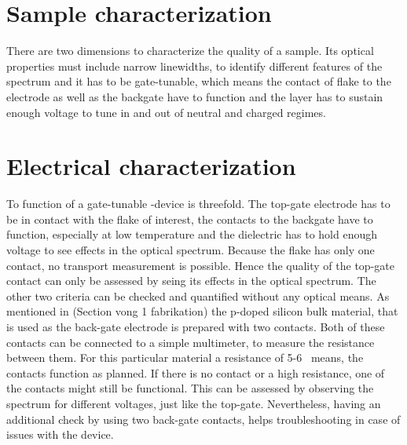 \section{Sample characterization}

There are two dimensions to characterize the quality of a sample. Its optical properties must include narrow linewidths, to identify different features of the spectrum and it has to be gate-tunable, which means the contact of \tmdg flake to the electrode as well as the backgate have to function and the \sio layer has to sustain enough voltage to tune in and out of neutral and charged regimes.

\section{Electrical characterization}

To function of a gate-tunable \tmd-device is threefold. The top-gate electrode has to be in contact with the flake of interest, the contacts to the backgate have to function, especially at low temperature and the dielectric has to hold enough voltage to see effects in the optical spectrum. Because the flake has only one contact, no transport measurement is possible. Hence the quality of the top-gate contact can only be assessed by seing its effects in the optical spectrum. The other two criteria can be checked and quantified without any optical means. As mentioned in (Section vong 1 fabrikation) the p-doped silicon bulk material, that is used as the back-gate electrode is prepared with two contacts. Both of these contacts can be connected to a simple multimeter, to measure the resistance between them. For this particular material a resistance of 5-6 \Omega\ means, the contacts function as planned. If there is no contact or a high resistance, one of the contacts might still be functional. This can be assessed by observing the spectrum for different voltages, just like the top-gate. Nevertheless, having an additional check by using two back-gate contacts, helps troubleshooting in case of issues with the device.


